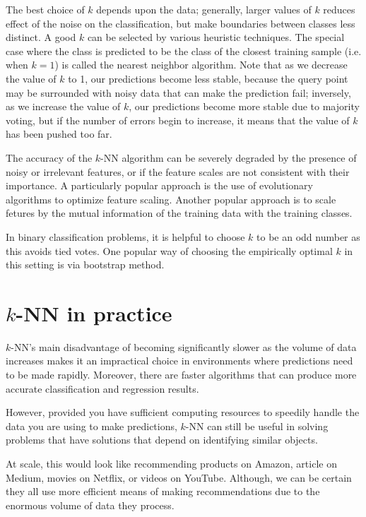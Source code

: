 The best choice of \(k\) depends upon the data; generally, larger values of \(k\) reduces effect of the noise on the classification, but make boundaries between classes less distinct. A good \(k\) can be selected by various heuristic techniques. The special case where the class is predicted to be the class of the closest training sample (i.e. when \(k=1\)) is called the nearest neighbor algorithm. Note that as we decrease the value of \(k\) to 1, our predictions become less stable, because the query point may be surrounded with noisy data that can make the prediction fail; inversely, as we increase the value of \(k\), our predictions become more stable due to majority voting, but if the number of errors begin to increase, it means that the value of \(k\) has been pushed too far.

The accuracy of the \(k\)-NN algorithm can be severely degraded by the presence of noisy or irrelevant features, or if the feature scales are not consistent with their importance. A particularly popular approach is the use of evolutionary algorithms to optimize feature scaling. Another popular approach is to scale fetures by the mutual information of the training data with the training classes. 

In binary classification problems, it is helpful to choose \(k\) to be an odd number as this avoids tied votes. One popular way of choosing the empirically optimal \(k\) in this setting is via bootstrap method.

\section{\(k\)-NN in practice}
\(k\)-NN's main disadvantage of becoming significantly slower as the volume of data increases makes it an impractical choice in environments where predictions need to be made rapidly. Moreover, there are faster algorithms that can produce more accurate classification and regression results.

However, provided you have sufficient computing resources to speedily handle the data you are using to make predictions, \(k\)-NN can still be useful in solving problems that have solutions that depend on identifying similar objects. 

At scale, this would look like recommending products on Amazon, article on Medium, movies on Netflix, or videos on YouTube. Although, we can be certain they all use more efficient means of making recommendations due to the enormous volume of data they process.

